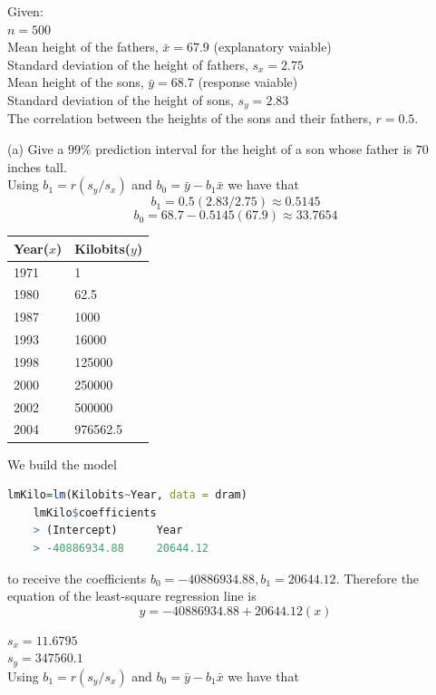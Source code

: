 \documentclass[boxes, qed]{homework}
\begin{document}
\begin{problem}Given:\\
  $n=500$\\
  Mean height of the fathers, $\bar{x}=67.9$ (explanatory vaiable)\\
  Standard deviation of the height of fathers, $s_x=2.75$\\
  Mean height of the sons, $\bar{y}=68.7$ (response vaiable)\\
  Standard deviation of the height of sons, $s_y=2.83$\\
  The correlation between the heights of the sons and their fathers, $r=0.5$.
\end{problem}
\begin{solution}
  (a) Give a $99$\% prediction interval for the height of a son whose father is $70$ inches tall.\\
  Using $b_1=r(s_y/s_x)$ and $b_0=\bar{y}-b_1\bar{x}$ we have that
  $$b_1=0.5(2.83/2.75)\approx 0.5145$$
  $$b_0=68.7 - 0.5145(67.9) \approx 33.7654$$
\end{solution}

\begin{problem}
  \begin{tabular}{l|l}\hline
    Year($x$) & Kilobits($y$)\\\hline
    1971&1\\\hline
    1980&62.5\\\hline
    1987&1000\\\hline
    1993&16000\\\hline
    1998&125000\\\hline
    2000&250000\\\hline
    2002&500000\\\hline
    2004&976562.5\\\hline
  \end{tabular}
\end{problem}
\begin{solution}
  We build the model
  \begin{lstlisting}[backgroundcolor = \color{lightgray},language = R]
    lmKilo=lm(Kilobits~Year, data = dram)
    lmKilo$coefficients
    > (Intercept)      Year 
    > -40886934.88     20644.12
  \end{lstlisting}
  to receive the coefficients $b_0=-40886934.88, b_1=20644.12$.
  Therefore the equation of the least-square regression line is
  $$\hat{y}=-40886934.88 + 20644.12(x)$$

  $s_x=11.6795$\\
  $s_y=347560.1$\\
  Using $b_1=r(s_y/s_x)$ and $b_0=\bar{y}-b_1\bar{x}$ we have that
\end{solution}
\pagebreak
\end{document}
